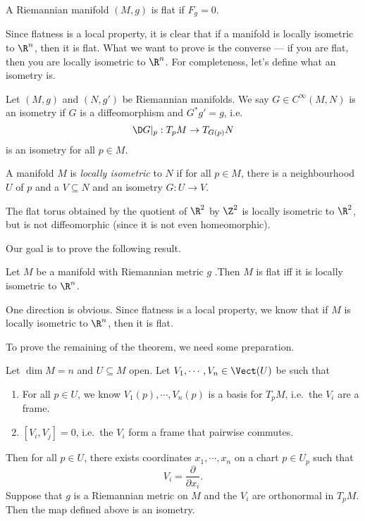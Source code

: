 \documentclass[a4paper]{article}
\begin{document}
\begin{defi}
  A Riemannian manifold $(M, g)$ is flat if $F_g = 0$.
\end{defi}

Since flatness is a local property, it is clear that if a manifold is locally isometric to $\R^n$, then it is flat. What we want to prove is the converse --- if you are flat, then you are locally isometric to $\R^n$. For completeness, let's define what an isometry is.

\begin{defi}[Isometry]
  Let $(M, g)$ and $(N, g')$ be Riemannian manifolds. We say $G \in C^\infty(M, N)$ is an isometry if $G$ is a diffeomorphism and $G^* g' = g$, i.e.
  \[
    \D G|_p: T_p M \to T_{G(p)} N
  \]
  is an isometry for all $p \in M$.
\end{defi}

\begin{defi}
  A manifold $M$ is \emph{locally isometric} to $N$ if for all $p \in M$, there is a neighbourhood $U$ of $p$ and a $V \subseteq N$ and an isometry $G: U \to V$.
\end{defi}

\begin{eg}
  The flat torus obtained by the quotient of $\R^2$ by $\Z^2$ is locally isometric to $\R^2$, but is not diffeomorphic (since it is not even homeomorphic).
\end{eg}

Our goal is to prove the following result.
\begin{thm}
  Let $M$ be a manifold with Riemannian metric $g$ .Then $M$ is flat iff it is locally isometric to $\R^n$.
\end{thm}

One direction is obvious. Since flatness is a local property, we know that if $M$ is locally isometric to $\R^n$, then it is flat.

To prove the remaining of the theorem, we need some preparation.
\begin{prop}
  Let $\dim M = n$ and $U \subseteq M$ open. Let $V_1, \cdots, V_n \in \Vect(U)$ be such that
  \begin{enumerate}
    \item For all $p \in U$, we know $V_1(p), \cdots, V_n(p)$ is a basis for $T_pM$, i.e.\ the $V_i$ are a frame.
    \item $[V_i, V_j] = 0$, i.e.\ the $V_i$ form a frame that pairwise commutes.
  \end{enumerate}
  Then for all $p \in U$, there exists coordinates $x_1, \cdots, x_n$ on a chart $p \in U_p$ such that
  \[
    V_i = \frac{\partial}{\partial x_i}.
  \]
  Suppose that $g$ is a Riemannian metric on $M$ and the $V_i$ are orthonormal in $T_pM$. Then the map defined above is an isometry.
\end{prop}
\end{document}
